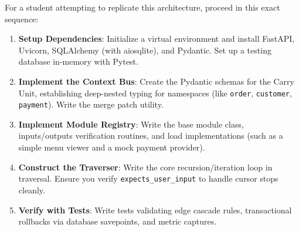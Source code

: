 \documentclass[12pt, a4paper]{report}
\begin{document}
For a student attempting to replicate this architecture, proceed in this exact sequence:

\begin{enumerate}
  \item \textbf{Setup Dependencies}: Initialize a virtual environment and install FastAPI, Uvicorn, SQLAlchemy (with aiosqlite), and Pydantic. Set up a testing database in-memory with Pytest.
  \item \textbf{Implement the Context Bus}: Create the Pydantic schemas for the Carry Unit, establishing deep-nested typing for namespaces (like \texttt{order}, \texttt{customer}, \texttt{payment}). Write the merge patch utility.
  \item \textbf{Implement Module Registry}: Write the base module class, inputs/outputs verification routines, and load implementations (such as a simple menu viewer and a mock payment provider).
  \item \textbf{Construct the Traverser}: Write the core recursion/iteration loop in traversal. Ensure you verify \texttt{expects_user_input} to handle cursor stops cleanly.
  \item \textbf{Verify with Tests}: Write tests validating edge cascade rules, transactional rollbacks via database savepoints, and metric captures.
\end{enumerate}
\end{document}
